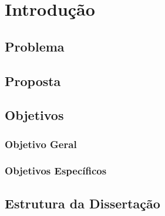 \chapter{Introdução}
\label{c.introducao}

\section{Problema}
\label{s.problema}

\section{Proposta}
\label{s.proposta}

\section{Objetivos}
\label{s.objetivo}

\subsection{Objetivo Geral}
\label{ss.objetivo_geral}

\subsection{Objetivos Específicos}
\label{ss.objetivo_especifico}

\section{Estrutura da Dissertação}
\label{s.estrutura}